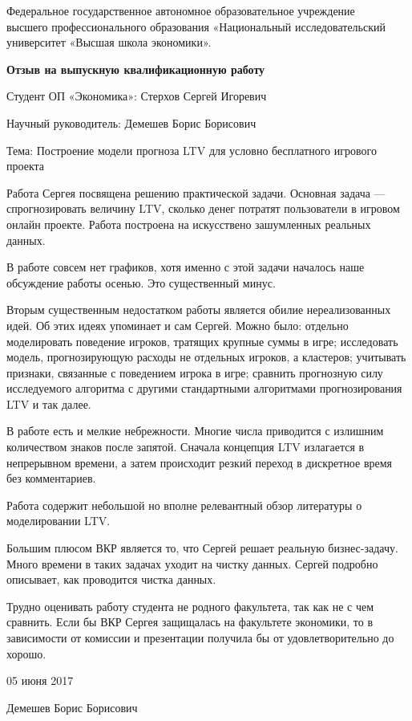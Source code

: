 \documentclass[a4paper, 12pt]{article}
\begin{document}
\begin{center}
{\small Федеральное государственное автономное образовательное учреждение\\ 
высшего профессионального образования «Национальный исследовательский\\ 
университет «Высшая школа экономики».}
\end{center}

\vspace{0.4cm}

\begin{center}
\textbf{Отзыв на выпускную квалификационную работу}
\end{center}

\vspace{0.4cm}

Студент ОП «Экономика»: Стерхов Сергей Игоревич

\vspace{0.4cm}

Научный руководитель: Демешев Борис Борисович

\vspace{0.4cm}

Тема: Построение модели прогноза LTV для условно бесплатного игрового проекта

\vspace{0.4cm}

Работа Сергея посвящена решению практической задачи. Основная задача ---
спрогнозировать величину LTV, сколько денег потратят пользователи в
игровом онлайн проекте. Работа построена на искусствено зашумленных
реальных данных.

В работе совсем нет графиков, хотя именно с этой задачи началось наше
обсуждение работы осенью. Это существенный минус.

Вторым существенным недостатком работы является обилие нереализованных
идей. Об этих идеях упоминает и сам Сергей. Можно было: отдельно
моделировать поведение игроков, тратящих крупные суммы в игре;
исследовать модель, прогнозирующую расходы не отдельных игроков, а
кластеров; учитывать признаки, связанные с поведением игрока в игре;
сравнить прогнозную силу исследуемого алгоритма с другими стандартными
алгоритмами прогнозирования LTV и так далее.

В работе есть и мелкие небрежности. Многие числа приводится с излишним
количеством знаков после запятой. Сначала концепция LTV излагается в
непрерывном времени, а затем происходит резкий переход в дискретное
время без комментариев.

Работа содержит небольшой но вполне релевантный обзор литературы о
моделировании LTV.

Большим плюсом ВКР является то, что Сергей решает реальную
бизнес-задачу. Много времени в таких задачах уходит на чистку данных.
Сергей подробно описывает, как проводится чистка данных.

Трудно оценивать работу студента не родного факультета, так как не с чем
сравнить. Если бы ВКР Сергея защищалась на факультете экономики, то в
зависимости от комиссии и презентации получила бы от удовлетворительно
до хорошо.

\vspace{0.4cm}

05 июня 2017

Демешев Борис Борисович
\end{document}
